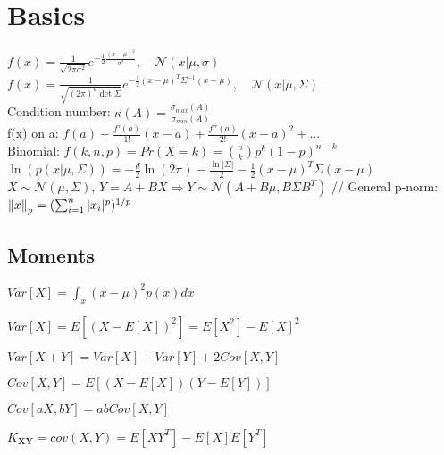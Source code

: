 \section{Basics}
$f(x) = \frac{1}{\sqrt{2\pi \sigma^2}} e^{- \frac{1}{2} \frac{(x-\mu)^2}{\sigma^2}},\quad \mathcal{N}(x|\mu, \sigma)$\\
$f(x) = \frac{1}{\sqrt{(2\pi)^d\det\Sigma}} e^{- \frac{1}{2} (x-\mu)^T \Sigma^{-1} (x-\mu)},\quad \mathcal{N}(x|\mu, \Sigma)$\\
Condition number: $\kappa(A)=\frac{\sigma_{max}(A)}{\sigma_{min}(A)}$ \\
f(x) on a: $f(a)+\tfrac{f'(a)}{1!}(x-a) + \tfrac{f''(a)}{2!}(x-a)^2 + ...$ \\
Binomial: $f(k,n,p) {=} Pr(X=k) {=} \binom nk p^k (1{-}p)^{n{-}k}$ \\
$\ln(p(x|\mu, \Sigma)) {=} {-}\tfrac{d}{2}\ln(2\pi) {-} \tfrac{\ln|\Sigma|}{2} {-} \tfrac{1}{2}(x{-}\mu)^T\Sigma(x{-}\mu)$ \\
$X {\sim} \mathcal{N}(\mu,\Sigma)$, $Y{=}A{+}BX \Rightarrow Y{\sim}\mathcal{N}(A{+}B\mu,B\Sigma B^T)$ //
General p-norm: $\left\lVert x \right\rVert_p = (\sum_{i=1}^n |x_i|^p)^{1/p}$

\subsection*{Moments}
\begin{inparaitem}[\color{red}\textbullet]
\item $Var[X]=\int_x(x-\mu)^2p(x) dx$ \\
\item $Var[X]=E[(X-E[X])^2]=E[X^2]-E[X]^2$ \\
\item $Var[X{+}Y]=Var[X]{+}Var[Y]{+}2Cov[X,Y]$ \\
\item $Cov[X,Y] = E[(X - E[X])(Y - E[Y])]$ \\
\item $Cov[aX,bY]{=}abCov[X,Y]$ \\
\item $K_{\bm{XY}} = cov(X,Y) = E[XY^T] - E[X]E[Y^T]$
\end{inparaitem}
